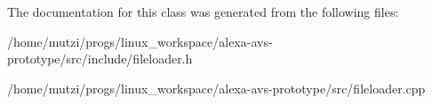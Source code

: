 The documentation for this class was generated from the following files\+:\begin{DoxyCompactItemize}
\item 
/home/mutzi/progs/linux\+\_\+workspace/alexa-\/avs-\/prototype/src/include/fileloader.\+h\item 
/home/mutzi/progs/linux\+\_\+workspace/alexa-\/avs-\/prototype/src/fileloader.\+cpp\end{DoxyCompactItemize}
